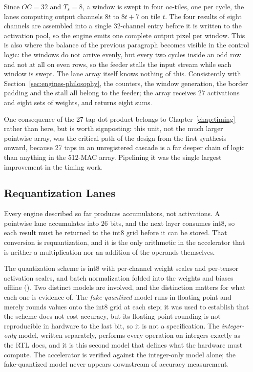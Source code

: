 Since $OC = 32$ and $T_s = 8$, a window is swept in four oc-tiles, one per
cycle, the lanes computing output channels $8t$ to $8t + 7$ on tile $t$. The
four results of eight channels are assembled into a single 32-channel entry
before it is written to the activation pool, so the engine emits one complete output pixel per window.
This is also where the balance of the previous paragraph becomes visible in
the control logic: the windows do not arrive evenly, but every two cycles
inside an odd row and not at all on even rows, so the feeder stalls the input
stream while each window is swept. The lane array itself knows nothing of
this. Consistently with Section~\ref{sec:engines-philosophy}, the counters,
the window generation, the border padding and the stall all belong to the
feeder; the array receives 27 activations and eight sets of weights, and
returns eight sums.

One consequence of the 27-tap dot product belongs to Chapter~\ref{chap:timing}
rather than here, but is worth signposting: this unit, not the much larger
pointwise array, was the critical path of the design from the first synthesis
onward, because 27 taps in an unregistered cascade is a far deeper chain of
logic than anything in the 512-MAC array. Pipelining it was the single largest
improvement in the timing work.

\subsection{Requantization Lanes}
\label{sec:requant-lanes}

Every engine described so far produces accumulators, not activations. A
pointwise lane accumulates into 26 bits, and the next layer consumes
int8, so each result must be returned to the int8 grid before it can be
stored. That conversion is requantization, and it is the only arithmetic in
the accelerator that is neither a multiplication nor an addition of the
operands themselves.

The quantization scheme is int8 with per-channel weight scales and per-tensor
activation scales, and batch normalization folded into the weights and biases
offline (). Two distinct models are involved, and the distinction
matters for what each one is evidence of. The \emph{fake-quantized} model runs
in floating point and merely rounds values onto the int8 grid at each step; it
was used to establish that the scheme does not cost accuracy, but its
floating-point rounding is not reproducible in hardware to the last bit, so it
is not a specification. The \emph{integer-only} model, written separately,
performs every operation on integers exactly as the RTL does, and it is this
second model that defines what the hardware must compute. The accelerator is
verified against the integer-only model alone; the fake-quantized model never
appears downstream of accuracy measurement.

